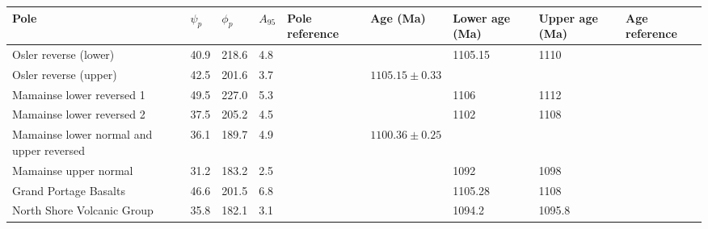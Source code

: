 \begin{tabular}{p{3cm} p{0.8cm} p{0.8cm} p{0.8cm} p{4cm} p{2.0cm} p{1.2cm} p{1.2cm} p{4.0cm}}
\toprule
                                     Pole &  $\psi_p$ &  $\phi_p$ &  $A_{95}$ &                                             Pole reference &            Age (Ma) & Lower age (Ma) & Upper age (Ma) &                                   Age reference \\
\midrule
                    Osler reverse (lower) &      40.9 &     218.6 &       4.8 &                            \citet{swanson2014confirmation} &                     &        1105.15 &           1110 &                          \citet{swanson2016new} \\
                    Osler reverse (upper) &      42.5 &     201.6 &       3.7 &     \citet{swanson2014confirmation,halls1974paleomagnetic} &  $1105.15 \pm 0.33$ &                &                &                          \citet{swanson2016new} \\
                Mamainse lower reversed 1 &      49.5 &     227.0 &       5.3 &                 \citet{swanson2009no, swanson2014magmatic} &                     &           1106 &           1112 &                     \citet{swanson2014magmatic} \\
                Mamainse lower reversed 2 &      37.5 &     205.2 &       4.5 &                 \citet{swanson2009no, swanson2014magmatic} &                     &           1102 &           1108 &                     \citet{swanson2014magmatic} \\
 Mamainse lower normal and upper reversed &      36.1 &     189.7 &       4.9 &                 \citet{swanson2009no, swanson2014magmatic} &  $1100.36 \pm 0.25$ &                &                &                     \citet{swanson2014magmatic} \\
                    Mamainse upper normal &      31.2 &     183.2 &       2.5 &                 \citet{swanson2009no, swanson2014magmatic} &                     &           1092 &           1098 &                     \citet{swanson2014magmatic} \\
                    Grand Portage Basalts &      46.6 &     201.5 &       6.8 &      \citet{books1968magnetization, tauxe2009paleosecular} &                     &        1105.28 &           1108 &                          \citet{swanson2016new} \\
               North Shore Volcanic Group &      35.8 &     182.1 &       3.1 &                              \citet{tauxe2009paleosecular} &                     &         1094.2 &         1095.8 &  \citet{schoene2006reassessing, swanson2016new} \\

\end{tabular}
